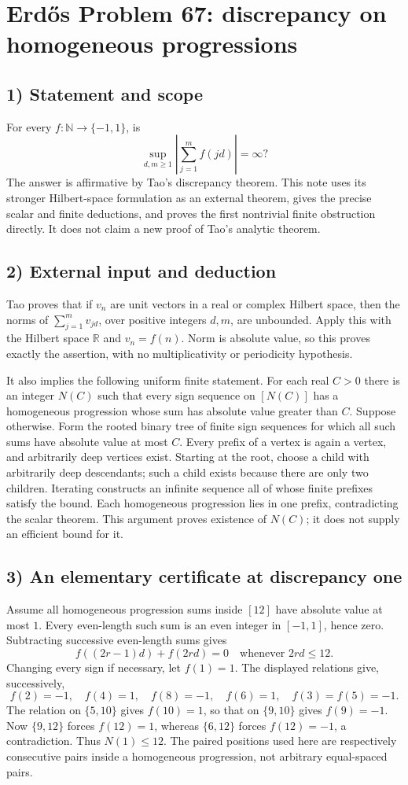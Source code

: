 \section{Erd\H{o}s Problem 67: discrepancy on homogeneous progressions}

\subsection{1) Statement and scope}
For every $f:\mathbb N\to\{-1,1\}$, is
\[
 \sup_{d,m\geq1}\left|\sum_{j=1}^m f(jd)\right|=\infty?
\]
The answer is affirmative by Tao's discrepancy theorem. This note uses
its stronger Hilbert-space formulation as an external theorem, gives the
precise scalar and finite deductions, and proves the first nontrivial
finite obstruction directly. It does not claim a new proof of Tao's
analytic theorem.

\subsection{2) External input and deduction}
Tao proves that if $v_n$ are unit vectors in a real or complex Hilbert
space, then the norms of $\sum_{j=1}^m v_{jd}$, over positive integers
$d,m$, are unbounded. Apply this with the Hilbert space $\mathbb R$
and $v_n=f(n)$. Norm is absolute value, so this proves exactly the
assertion, with no multiplicativity or periodicity hypothesis.

It also implies the following uniform finite statement. For each real
$C>0$ there is an integer $N(C)$ such that every sign sequence on
$[N(C)]$ has a homogeneous progression whose sum has absolute value
greater than $C$. Suppose otherwise. Form the rooted binary tree of
finite sign sequences for which all such sums have absolute value at
most $C$. Every prefix of a vertex is again a vertex, and arbitrarily
deep vertices exist. Starting at the root, choose a child with arbitrarily
deep descendants; such a child exists because there are only two children.
Iterating constructs an infinite sequence all of whose finite prefixes
satisfy the bound. Each homogeneous progression lies in one prefix,
contradicting the scalar theorem. This argument proves existence of
$N(C)$; it does not supply an efficient bound for it.

\subsection{3) An elementary certificate at discrepancy one}
Assume all homogeneous progression sums inside $[12]$ have absolute
value at most $1$. Every even-length such sum is an even integer in
$[-1,1]$, hence zero. Subtracting successive even-length sums gives
\[
 f((2r-1)d)+f(2rd)=0\quad\text{whenever }2rd\leq12.
\]
Changing every sign if necessary, let $f(1)=1$. The displayed relations
give, successively,
\[
 f(2)=-1,\quad f(4)=1,\quad f(8)=-1,\quad
 f(6)=1,\quad f(3)=f(5)=-1.
\]
The relation on $\{5,10\}$ gives $f(10)=1$, so that on $\{9,10\}$
gives $f(9)=-1$. Now $\{9,12\}$ forces $f(12)=1$, whereas
$\{6,12\}$ forces $f(12)=-1$, a contradiction. Thus $N(1)\leq12$.
The paired positions used here are respectively consecutive pairs
inside a homogeneous progression, not arbitrary equal-spaced pairs.

